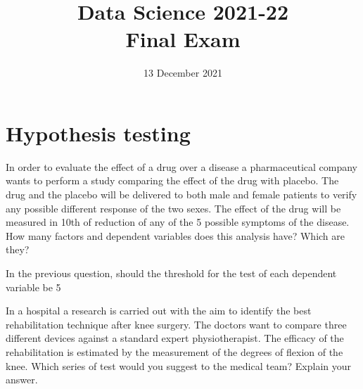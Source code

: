 \documentclass[11pt]{article}
\title{
\vspace{-1.2cm}
Data Science 2021-22\\ Final Exam}
\author{13 December 2021}
\date{}%
\newcounter{marks}
\begin{document}
\maketitle


\section*{Hypothesis testing}
\begin{list}{{\bf Question 1.:}}
	{
	}

\item
{}
\addtocounter{marks}{1}
In order to evaluate the effect of a drug over a disease a pharmaceutical company wants to perform a study comparing the effect of the drug with placebo. The drug and the placebo will be delivered to both male and female patients to verify any possible different response of the two sexes. The effect of the drug will be measured in 10th of reduction of any of the 5 possible symptoms of the disease. How many factors and dependent variables does this analysis have? Which are they?

\item
{}
\addtocounter{marks}{1}
In the previous question, should the threshold for the test of each dependent variable be 5%

\item
{}
\addtocounter{marks}{1}
In a hospital a research is carried out with the aim to identify the best rehabilitation technique after knee surgery. The doctors want to compare three different devices against a standard expert physiotherapist. The efficacy of the rehabilitation is estimated by the measurement of the degrees of flexion of the knee. Which series of test would you suggest to the medical team? Explain your answer.

\end{list}

\pagebreak

\end{document}

